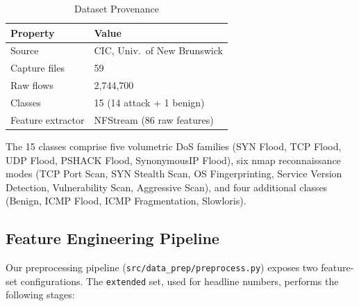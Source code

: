 \documentclass[conference]{IEEEtran}
\newcommand{\col}[1]{\texttt{\small #1}}
\begin{document}
\begin{table}[htbp]
\caption{Dataset Provenance}
\centering
\begin{tabular}{ll}
\toprule
\textbf{Property} & \textbf{Value} \\
\midrule
Source & CIC, Univ.\ of New Brunswick \\
Capture files & 59 \\
Raw flows & 2,744,700 \\
Classes & 15 (14 attack + 1 benign) \\
Feature extractor & NFStream (86 raw features) \\
\bottomrule
\end{tabular}
\label{tab:provenance}
\end{table}

The 15 classes comprise five volumetric DoS families (SYN Flood, TCP Flood, UDP Flood, PSHACK Flood, SynonymousIP Flood), six nmap reconnaissance modes (TCP Port Scan, SYN Stealth Scan, OS Fingerprinting, Service Version Detection, Vulnerability Scan, Aggressive Scan), and four additional classes (Benign, ICMP Flood, ICMP Fragmentation, Slowloris).

\subsection{Feature Engineering Pipeline}

Our preprocessing pipeline (\col{src/data\_prep/preprocess.py}) exposes two feature-set configurations. The \texttt{extended} set, used for headline numbers, performs the following stages:
\end{document}
